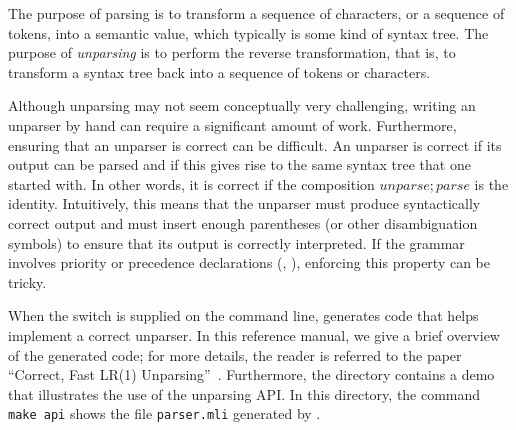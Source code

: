 
The purpose of parsing is to transform a sequence of characters, or a sequence
of tokens, into a semantic value, which typically is some kind of syntax tree.
The purpose of \emph{unparsing} is to perform the reverse transformation, that
is, to transform a syntax tree back into a sequence of tokens or characters.

Although unparsing may not seem conceptually very challenging, writing an
unparser by hand can require a significant amount of work. Furthermore,
ensuring that an unparser is correct can be difficult. An unparser is correct
if its output can be parsed and if this gives rise to the same syntax tree
that one started with. In other words, it is correct if the composition
$\mathit{unparse}; \mathit{parse}$ is the identity. Intuitively, this means
that the unparser must produce syntactically correct output and must insert
enough parentheses (or other disambiguation symbols) to ensure that its output
is correctly interpreted. If the grammar involves priority or precedence
declarations (, ), enforcing this property can
be tricky.


When the switch \ounparsing is supplied on the command line, \menhir generates
code that helps implement a correct unparser. In this reference manual, we
give a brief overview of the generated code; for more details, the reader is
referred to the paper ``Correct, Fast {LR(1)}
Unparsing''~\cite{pottier-unparsing-24}.
Furthermore, the directory 
contains a demo that illustrates the use of the unparsing API.
In this directory,
the command \texttt{make api} shows the file \texttt{parser.mli}
generated by \menhir.


